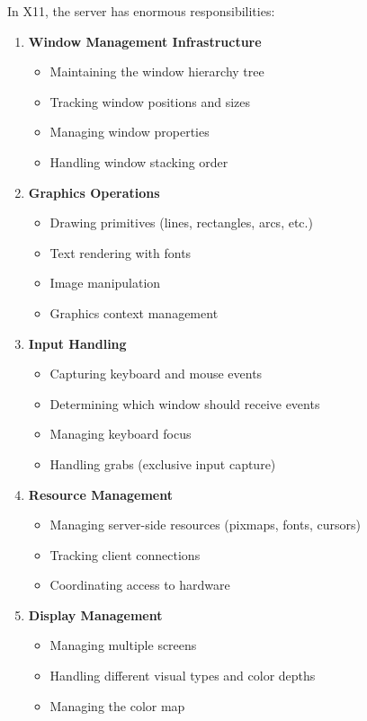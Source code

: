 In X11, the server has enormous responsibilities:

\begin{enumerate}[leftmargin=*]
    \item \textbf{Window Management Infrastructure}
    \begin{itemize}
        \item Maintaining the window hierarchy tree
        \item Tracking window positions and sizes
        \item Managing window properties
        \item Handling window stacking order
    \end{itemize}

    \item \textbf{Graphics Operations}
    \begin{itemize}
        \item Drawing primitives (lines, rectangles, arcs, etc.)
        \item Text rendering with fonts
        \item Image manipulation
        \item Graphics context management
    \end{itemize}

    \item \textbf{Input Handling}
    \begin{itemize}
        \item Capturing keyboard and mouse events
        \item Determining which window should receive events
        \item Managing keyboard focus
        \item Handling grabs (exclusive input capture)
    \end{itemize}

    \item \textbf{Resource Management}
    \begin{itemize}
        \item Managing server-side resources (pixmaps, fonts, cursors)
        \item Tracking client connections
        \item Coordinating access to hardware
    \end{itemize}

    \item \textbf{Display Management}
    \begin{itemize}
        \item Managing multiple screens
        \item Handling different visual types and color depths
        \item Managing the color map
    \end{itemize}
\end{enumerate}

